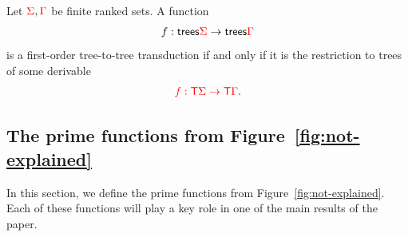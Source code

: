 
\begin{theorem}\label{thm:main}
    Let ${\color{red}{\Sigma}},{\color{red}{\Gamma}}$ be finite ranked sets. A function 
    \begin{align*}
        f : \mathsf {trees} {\color{red}{\Sigma}} \to \mathsf {trees} {\color{red}{\Gamma}}
    \end{align*}
    is a first-order tree-to-tree transduction if and only if it is the restriction to trees of some derivable
    \begin{align*}
        {\color{red}{f : {\color{red}{\mathsf T}}\Sigma \to {\color{red}{\mathsf T}}\Gamma}}.
    \end{align*}
    
\end{theorem}


%
\subsection{The prime functions from Figure~\ref{fig:not-explained}}
\label{sec:prime-and-combinators}
In this section, we define the prime functions from Figure~\ref{fig:not-explained}. 
Each of these functions will play a key role in one of the main results of the paper.

